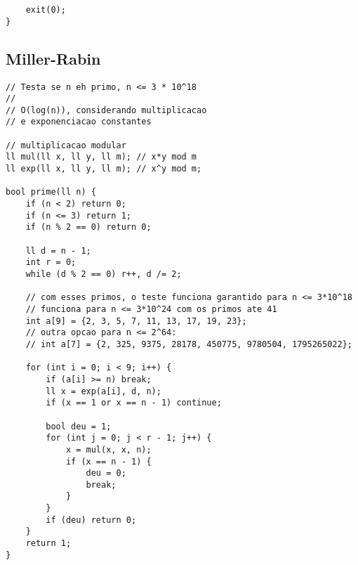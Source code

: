 \documentclass[12pt, a4paper, twoside]{article}
\begin{document}
\begin{lstlisting}
	exit(0);
}
\end{lstlisting}

\subsection{Miller-Rabin}
\begin{lstlisting}
// Testa se n eh primo, n <= 3 * 10^18
//
// O(log(n)), considerando multiplicacao
// e exponenciacao constantes

// multiplicacao modular
ll mul(ll x, ll y, ll m); // x*y mod m
ll exp(ll x, ll y, ll m); // x^y mod m;

bool prime(ll n) {
	if (n < 2) return 0;
	if (n <= 3) return 1;
	if (n % 2 == 0) return 0;

	ll d = n - 1;
	int r = 0;
	while (d % 2 == 0) r++, d /= 2;

 	// com esses primos, o teste funciona garantido para n <= 3*10^18
	// funciona para n <= 3*10^24 com os primos ate 41
	int a[9] = {2, 3, 5, 7, 11, 13, 17, 19, 23};
	// outra opcao para n <= 2^64:
	// int a[7] = {2, 325, 9375, 28178, 450775, 9780504, 1795265022};

	for (int i = 0; i < 9; i++) {
		if (a[i] >= n) break;
		ll x = exp(a[i], d, n);
		if (x == 1 or x == n - 1) continue;

		bool deu = 1;
		for (int j = 0; j < r - 1; j++) {
			x = mul(x, x, n);
			if (x == n - 1) {
				deu = 0;
				break;
			}
		}
		if (deu) return 0;
	}
	return 1;
}
\end{lstlisting}
\end{document}
